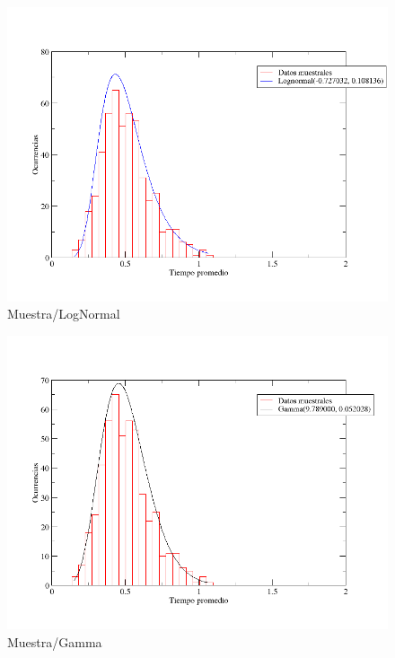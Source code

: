 \documentclass[10pt,a4paper]{article}
\begin{document}
\begin{figure}
  \centering
  \includegraphics[scale=0.5]{freq-lognormal.png} 
  \caption{Muestra/LogNormal}
  \label{freq-lognormal}
\end{figure}

\begin{figure}
  \centering
  \includegraphics[scale=0.5]{freq-gamma.png} 
  \caption{Muestra/Gamma}
  \label{freq-gamma}
\end{figure}
\end{document}
